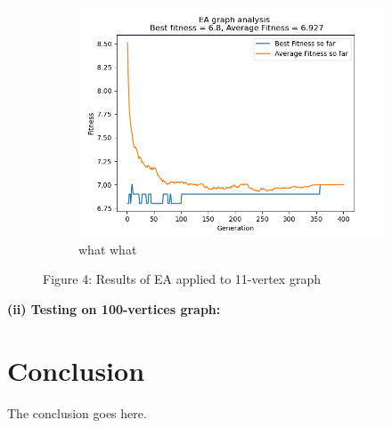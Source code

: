 \documentclass[conference,compsoc]{IEEEtran}
\begin{document}
\begin{figure}
\begin{subfigure}{0.34\textwidth}
    \includegraphics[width=\linewidth]{../Results/_11_Truncation_Truncation_100_50_400.png}
    \caption{what what}
  \end{subfigure}
  \caption*{Figure 4: Results of EA applied to 11-vertex graph}
\end{figure}

\newpage
\begin{center}
  \textbf{(ii) Testing on 100-vertices graph:}
\end{center}
\begin{figure}
  
\end{figure}
\newpage
\section{Conclusion}
The conclusion goes here.




\newpage



\end{document}
